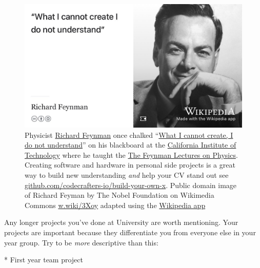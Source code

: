 \documentclass[
]{book}
\newenvironment{Shaded}{\begin{snugshade}}{\end{snugshade}}
\newcommand{\NormalTok}[1]{#1}
\newcommand{\SpecialStringTok}[1]{\textcolor[rgb]{0.31,0.60,0.02}{#1}}
\begin{document}
\begin{figure}

{\centering \includegraphics[width=1\linewidth]{images/what-I-cannot-create-I-do-not-understand} 

}

\caption{Physicist \href{https://en.wikipedia.org/wiki/Richard_Feynman}{Richard Feynman} once chalked ``\href{https://calisphere.org/item/b3e8d3cb9b8adc01314dba1b1f1fcf84/}{What I cannot create, I do not understand}'' on his blackboard at the \href{https://en.wikipedia.org/wiki/California_Institute_of_Technology}{California Institute of Technology} where he taught the \href{https://en.wikipedia.org/wiki/The_Feynman_Lectures_on_Physics}{The Feynman Lectures on Physics}. \citep{feynmanblackboard} Creating software and hardware in personal side projects is a great way to build new understanding \emph{and} help your CV stand out see \href{https://github.com/codecrafters-io/build-your-own-x}{github.com/codecrafters-io/build-your-own-x}. Public domain image of Richard Feyman by The Nobel Foundation on Wikimedia Commons \href{https://w.wiki/3Xoy}{w.wiki/3Xoy} adapted using the \href{https://apps.apple.com/us/app/wikipedia/id324715238}{Wikipedia app}}\label{fig:feynman-fig}
\end{figure}



Any longer projects you've done at University are worth mentioning. Your projects are important because they differentiate you from everyone else in your year group. Try to be \emph{more} descriptive than this:

\begin{Shaded}
\begin{Highlighting}[]
\SpecialStringTok{* }\NormalTok{First year team project}
\end{Highlighting}
\end{Shaded}
\end{document}

